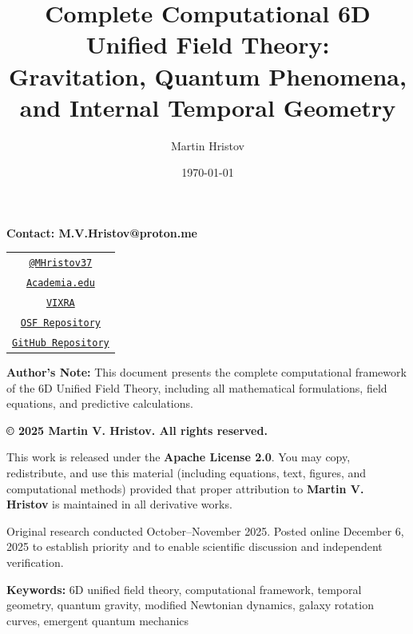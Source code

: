 \documentclass[12pt]{article}
\title{\bfseries
Complete Computational 6D Unified Field Theory:\\[4pt]
Gravitation, Quantum Phenomena, and Internal Temporal Geometry}
\author{Martin Hristov}
\date{\today}
\newcommand{\keywords}[1]{\vspace{0.5em}\noindent\textbf{Keywords:} #1}
\begin{document}
\maketitle

\begin{center}
\textbf{Contact: M.V.Hristov@proton.me}
\end{center}

\begin{center}
\begin{tabular}{@{}c@{}}
\href{https://x.com/MHristov37}{\texttt{@MHristov37}} \\
\href{https://independent.academia.edu/MartinHristov37}{\texttt{Academia.edu}} \\
\href{https://ai.vixra.org/author/martin_hristov}{\texttt{VIXRA}} \\
\href{https://osf.io/ubdm9/overview}{\texttt{OSF Repository}} \\
\href{https://github.com/MartinVHristov/}{\texttt{GitHub Repository}}
\end{tabular}
\end{center}

\vspace{1em}

\begin{center}
\parbox{0.9\textwidth}{
\textbf{Author's Note:} This document presents the complete computational framework of the 6D Unified Field Theory, including all mathematical formulations, field equations, and predictive calculations.
}
\end{center}

\vspace{1em}

\begin{center}
{\small
\textbf{© 2025 Martin V. Hristov. All rights reserved.}

This work is released under the \textbf{Apache License 2.0}.  
You may copy, redistribute, and use this material (including equations, text,  
figures, and computational methods) provided that proper attribution to  
\textbf{Martin V. Hristov} is maintained in all derivative works.

Original research conducted October–November 2025.  
Posted online December 6, 2025 to establish priority and to enable  
scientific discussion and independent verification.
}
\end{center}
\vspace{1em}

\keywords{6D unified field theory, computational framework, temporal geometry, quantum gravity, modified Newtonian dynamics, galaxy rotation curves, emergent quantum mechanics}
\end{document}
